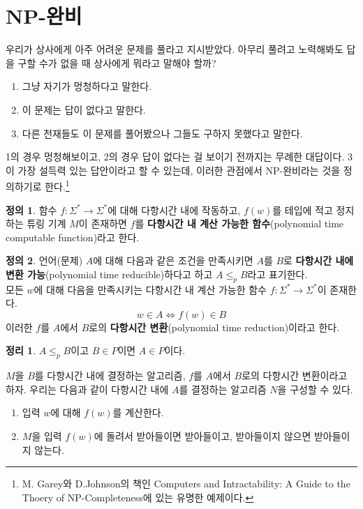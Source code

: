 \documentclass[b5paper]{book}
\theoremstyle{definition}
\newtheorem{defn}{정의}[chapter]
\newtheorem{thm}{정리}[chapter]
\newenvironment{pf*}{\pushQED{\qed}\pf}{\popQED\endpf}
\begin{document}
\section{NP-완비}
우리가 상사에게 아주 어려운 문제를 풀라고 지시받았다. 아무리 풀려고 노력해봐도 답을 구할 수가 없을 때
상사에게 뭐라고 말해야 할까?
\begin{enumerate}
    \item 그냥 자기가 멍청하다고 말한다.
    \item 이 문제는 답이 없다고 말한다.
    \item 다른 천재들도 이 문제를 풀어봤으나 그들도 구하지 못했다고 말한다.
\end{enumerate}
1의 경우 멍청해보이고, 2의 경우 답이 없다는 걸 보이기 전까지는 무례한 대답이다. 3이 가장 설득력 있는
답안이라고 할 수 있는데, 이러한 관점에서 NP-완비라는 것을 정의하기로 한다.\footnote{M. Garey와 
D.Johnson의 책인 
Computers and Intractability: A Guide to the Thoery of NP-Completeness에 있는 유명한 예제이다.}
\begin{defn}
    함수 $f: \Sigma^* \rightarrow \Sigma^*$에 대해 다항시간 내에 작동하고, $f(w)$를 테입에 적고 정지하는 
    튜링 기계 $M$이 존재하면 $f$를 \textbf{다항시간 내 계산 가능한 함수}(polynomial
    time computable function)라고 한다.
\end{defn}
\begin{defn}
    언어(문제) $A$에 대해 다음과 같은 조건을 만족시키면 $A$를 $B$로 \textbf{다항시간 내에 변환 
    가능}(polynomial time reducible)하다고 하고 $A \le_p B$라고 표기한다. \\ 
    모든 $w$에 대해 다음을 만족시키는 다항시간 내 계산 가능한 함수 $f: \Sigma^* \rightarrow \Sigma^*$이
    존재한다.
    $$w \in A \Longleftrightarrow f(w) \in B$$
    이러한 $f$를 $A$에서 $B$로의 \textbf{다항시간 변환}(polynomial time reduction)이라고 한다. 
\end{defn}
\begin{thm}
    $A \le_p B$이고 $B \in P$이면 $A \in P$이다.
\end{thm}
\begin{pf*}
    $M$을 $B$를 다항시간 내에 결정하는 알고리즘, $f$를 $A$에서 $B$로의 다항시간 변환이라고 하자. 
    우리는 다음과 같이 다항시간 내에 $A$를 결정하는 알고리즘 $N$을 구성할 수 있다.
    \begin{enumerate}
        \item 입력 $w$에 대해 $f(w)$를 계산한다.
        \item $M$을 입력 $f(w)$에 돌려서 받아들이면 받아들이고, 받아들이지 않으면 받아들이지 않는다.
    \end{enumerate}
\end{pf*}
\end{document}
